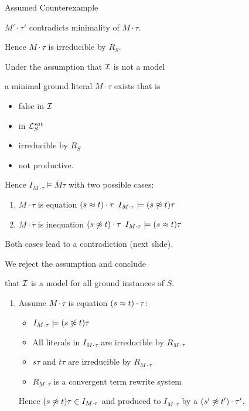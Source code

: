 \documentclass[%
handout,
]{beamer}
\begin{document}
\begin{frame}[allowframebreaks]{Assumed Counterexample}
\begin{itemize}
            $M'\cdot\tau'$ contradicts minimality of $M\cdot\tau$.

        \end{itemize}

        Hence $M\cdot\tau$ is irreducible by $R_S$.

\framebreak
        Under the assumption that $\mathcal{I}$ is not a model

        a minimal ground literal $M\cdot\tau$ exists that is
    \begin{itemize}
        \item false in $\mathcal{I}$
        \item in $\mathcal{L}_S^{sat}$
        \item irreducible by $R_S$
        \item not productive.
    \end{itemize}
    \vspace{1em}

    Hence $I_{M\cdot\tau}\models\overline{M}\tau$
    with two possible cases:

    \begin{enumerate}
        \item $M\cdot\tau$ is equation $(s\approx t)\cdot\tau$  \hfill $I_{M\cdot\tau}\models (s\not\approx t)\tau$
        \item $M\cdot\tau$ is inequation $(s\not\approx t)\cdot\tau$ \hfill $I_{M\cdot\tau}\models (s\approx t)\tau$
    \end{enumerate}

    \vspace{0.7em}
    Both cases lead to a contradiction (next slide).

    We reject the assumption and conclude

    that $\mathcal{I}$ is a model for all ground instances of $S$.

\framebreak


    \begin{enumerate}
        \item Assume $M\cdot\tau$ is equation $(s\approx t)\cdot\tau$:
        \begin{itemize}
            \item $I_{M\cdot\tau}\models (s\not\approx t)\tau$
            \item All literals in $I_{M\cdot\tau}$ are irreducible by $R_{M\cdot\tau}$
            \item $s\tau$ and $t\tau$ are irreducible by $R_{M\cdot\tau}$
            \item $R_{M\cdot\tau}$ is a convergent term rewrite system
        \end{itemize}
        Hence $(s\not\approx t)\tau\in I_{M\cdot\tau}$ and
        produced to $I_{M\cdot\tau}$ by a $(s'\not\approx t')\cdot\tau'$.


\end{enumerate}
\end{frame}
\end{document}
